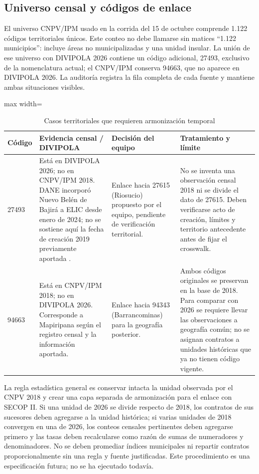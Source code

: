 \subsection{Universo censal y códigos de enlace}

El universo CNPV/IPM usado en la corrida del 15 de octubre comprende 1.122 códigos territoriales únicos. Este conteo no debe llamarse sin matices \enquote{1.122 municipios}: incluye áreas no municipalizadas y una unidad insular. La unión de ese universo con DIVIPOLA 2026 contiene un código adicional, 27493, exclusivo de la nomenclatura actual; el CNPV/IPM conserva 94663, que no aparece en DIVIPOLA 2026. La auditoría registra la fila completa de cada fuente y mantiene ambas situaciones visibles.

\begin{table}[htbp]
\centering\small
\caption{Casos territoriales que requieren armonización temporal}
\label{tab:casos_territoriales}
\begin{adjustbox}{max width=\textwidth}
\begin{tabular}{@{}p{}p{}p{}p{}@{}}
\toprule
\textbf{Código} & \textbf{Evidencia censal / DIVIPOLA} & \textbf{Decisión del equipo} & \textbf{Tratamiento y límite} \\
\midrule
27493 & Está en DIVIPOLA 2026; no en CNPV/IPM 2018. DANE incorporó Nuevo Belén de Bajirá a ELIC desde enero de 2024; no se sostiene aquí la fecha de creación 2019 previamente aportada \citep{dane2024elic}. & Enlace hacia 27615 (Riosucio) propuesto por el equipo, pendiente de verificación territorial. & No se inventa una observación censal 2018 ni se divide el dato de 27615. Deben verificarse acto de creación, límites y territorio antecedente antes de fijar el crosswalk. \\
94663 & Está en CNPV/IPM 2018; no en DIVIPOLA 2026. Corresponde a Mapiripana según el registro censal y la información aportada. & Enlace hacia 94343 (Barrancominas) para la geografía posterior. & Ambos códigos originales se preservan en la base de 2018. Para comparar con 2026 se requiere llevar las observaciones a geografía común; no se asignan contratos a unidades históricas que ya no tienen código vigente. \\
\bottomrule
\end{tabular}
\end{adjustbox}
\end{table}

La regla estadística general es conservar intacta la unidad observada por el CNPV 2018 y crear una capa separada de armonización para el enlace con SECOP II. Si una unidad de 2026 se divide respecto de 2018, los contratos de sus sucesores deben agregarse a la unidad histórica; si varias unidades de 2018 convergen en una de 2026, los conteos censales pertinentes deben agregarse primero y las tasas deben recalcularse como razón de sumas de numeradores y denominadores. No se deben promediar índices municipales ni repartir contratos proporcionalmente sin una regla y fuente justificadas. Este procedimiento es una especificación futura; no se ha ejecutado todavía.

